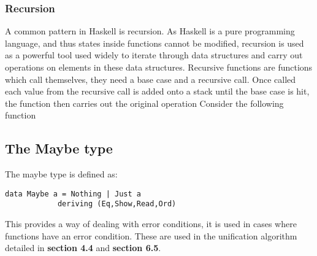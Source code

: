 \documentclass{article}%
\begin{document}
\subsubsection{Recursion}
A common pattern in Haskell is recursion. As Haskell is a pure programming language, and thus states inside functions cannot be modified, recursion is used as a powerful tool used widely to iterate through data structures and carry out operations on elements in these data structures. Recursive functions are functions which call themselves, they need a base case and a recursive call. Once called each value from the recursive call is added onto a stack until the base case is hit, the function then carries out the original operation 
Consider the following function 
\subsection{The Maybe type}
The maybe type is defined as:
\begin{verbatim}
data Maybe a = Nothing | Just a  
   			deriving (Eq,Show,Read,Ord)
\end{verbatim}
This provides a way of dealing with error conditions, it is used in cases where functions have an error condition. These are used in the unification algorithm detailed in \textbf{section 4.4} and \textbf{section 6.5}. 
\end{document}

